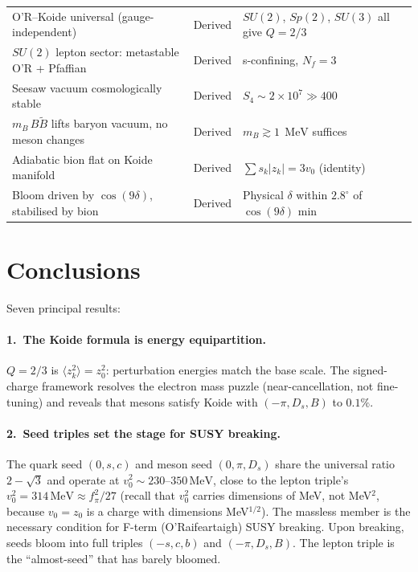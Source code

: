 \documentclass[12pt,a4paper]{article}
\newcommand{\MeV}{\,\text{MeV}}
\newcommand{\fpi}{f_\pi}
\begin{document}
\begin{center}
\begin{tabular}{lll}
O'R--Koide universal (gauge-independent) & Derived & $SU(2)$, $Sp(2)$, $SU(3)$ all give $Q = 2/3$ \\
$SU(2)$ lepton sector: metastable O'R + Pfaffian & Derived & s-confining, $N_f = 3$ \\
Seesaw vacuum cosmologically stable & Derived & $S_4 \sim 2 \times 10^7 \gg 400$ \\
$m_B\,B\tilde B$ lifts baryon vacuum, no meson changes & Derived & $m_B \gtrsim 1\;\MeV$ suffices \\
Adiabatic bion flat on Koide manifold & Derived & $\sum s_k|z_k| = 3v_0$ (identity) \\
Bloom driven by $\cos(9\delta)$, stabilised by bion & Derived & Physical $\delta$ within $2.8^\circ$ of $\cos(9\delta)$ min \\
\bottomrule
\end{tabular}
\end{center}

\section{Conclusions}
\label{sec:conclusions}

Seven principal results:

\paragraph{1.\ The Koide formula is energy equipartition.}
$Q = 2/3$ is $\langle z_k^2\rangle = z_0^2$: perturbation energies 
match the base scale. The signed-charge framework resolves the 
electron mass puzzle (near-cancellation, not fine-tuning) and reveals 
that mesons satisfy Koide with $(-\pi, D_s, B)$ to $0.1\%$.

\paragraph{2.\ Seed triples set the stage for SUSY breaking.}
The quark seed $(0,s,c)$ and meson seed $(0,\pi,D_s)$ share the
universal ratio $2 - \sqrt{3}$ and operate at $v_0^2 \sim
230$--$350\MeV$, close to the lepton triple's $v_0^2 = 314\MeV
\approx \fpi^2/27$
(recall that $v_0^2$ carries dimensions of MeV, not MeV$^2$,
because $v_0 = z_0$ is a charge with dimensions MeV$^{1/2}$). 
The massless member is the necessary condition for F-term 
(O'Raifeartaigh) SUSY breaking. Upon breaking, seeds bloom into 
full triples $(-s,c,b)$ and $(-\pi,D_s,B)$. The lepton triple 
is the ``almost-seed'' that has barely bloomed.
\end{document}
